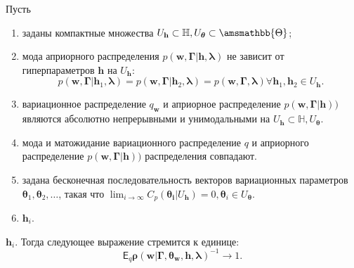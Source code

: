 \begin{theorem}
Пусть
\begin{enumerate}
\item заданы компактные множества $U_\mathbf{h} \subset \mathbb{H}, U_{\boldsymbol{\theta}} \subset \amsmathbb{\Theta}$;


\item мода априорного распределения $p(\mathbf{w},\boldsymbol{\Gamma}| \mathbf{h}, \boldsymbol{\lambda})$ не зависит от гиперпараметров $\mathbf{h}$ на $U_\mathbf{h}$:
\[
    p(\mathbf{w},\boldsymbol{\Gamma}| \mathbf{h}_1, \boldsymbol{\lambda}) = p(\mathbf{w},\boldsymbol{\Gamma}| \mathbf{h}_2, \boldsymbol{\lambda}) =  p(\mathbf{w},\boldsymbol{\Gamma}, \boldsymbol{\lambda}) \forall \mathbf{h}_1,\mathbf{h}_2 \in U_{\mathbf{h}}. 
\]

\item вариационное распределение $q_\mathbf{w}$ и априорное распределение $p(\mathbf{w},\boldsymbol{\Gamma}| \mathbf{h}))$  являются абсолютно непрерывными и унимодальными на  $U_\mathbf{h} \subset \mathbb{H}, U_{\boldsymbol{\theta}}$.

\item мода и матожидание вариационного распределение $q$ и априорного распределение $p(\mathbf{w},\boldsymbol{\Gamma}| \mathbf{h}))$  распределения совпадают.

\item задана  бесконечная последовательность векторов вариационных параметров $\boldsymbol{\theta}_1,\boldsymbol{\theta}_2,\dots$, такая что $\lim_{i \to \infty}C_p(\boldsymbol{\theta_i}|U_{\mathbf{h}}) = 0, \boldsymbol{\theta}_i \in U_{\boldsymbol{\theta}}.$ 

\item $\mathbf{h}_i$. 
\end{enumerate}
$\mathbf{h}_i$.
Тогда следующее выражение стремится к единице:
\[
   \mathsf{E}_q \boldsymbol{\rho}(\mathbf{w}|\boldsymbol{\Gamma}, \boldsymbol{\theta}_\mathbf{w}, \mathbf{h},\boldsymbol{\lambda})^{-1} \to 1.
\]


\end{theorem}

